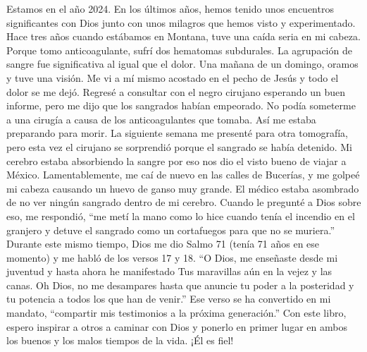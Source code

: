 \documentclass[twoside, 12pt]{book}
\begin{document}
Estamos en el año 2024. En los últimos años, hemos tenido unos encuentros significantes con Dios junto con unos milagros que hemos visto y experimentado. Hace tres años cuando estábamos en Montana, tuve una caída seria en mi cabeza. Porque tomo anticoagulante, sufrí dos hematomas subdurales. La agrupación de sangre fue significativa al igual que el dolor. Una mañana de un domingo, oramos y tuve una visión. Me vi a mí mismo acostado en el pecho de Jesús y todo el dolor se me dejó.
Regresé a consultar con el negro cirujano esperando un buen informe, pero me dijo que los sangrados habían empeorado. No podía someterme a una cirugía a causa de los anticoagulantes que tomaba. Así me estaba preparando para morir. La siguiente semana me presenté para otra tomografía, pero esta vez el cirujano se sorprendió porque el sangrado se había detenido. Mi cerebro estaba absorbiendo la sangre por eso nos dio el visto bueno de viajar a México. Lamentablemente, me caí de nuevo en las calles de Bucerías, y me golpeé mi cabeza causando un huevo de ganso muy grande. El médico estaba asombrado de no ver ningún sangrado dentro de mi cerebro. Cuando le pregunté a Dios sobre eso, me respondió, “me metí la mano como lo hice cuando tenía el incendio en el granjero y detuve el sangrado como un cortafuegos para que no se muriera.”
Durante este mismo tiempo, Dios me dio Salmo 71 (tenía 71 años en ese momento) y me habló de los versos 17 y 18. “O Dios, me enseñaste desde mi juventud y hasta ahora he manifestado Tus maravillas aún en la vejez y las canas. Oh Dios, no me desampares hasta que anuncie tu poder a la posteridad y tu potencia a todos los que han de venir.” Ese verso se ha convertido en mi mandato, “compartir mis testimonios a la próxima generación.”
Con este libro, espero inspirar a otros a caminar con Dios y ponerlo en primer lugar en ambos los buenos y los malos tiempos de la vida. ¡Él es fiel!
\
\clearpage
\end{document}
